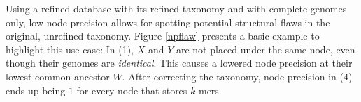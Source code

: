 \documentclass[pdflatex,sn-vancouver-num]{sn-jnl}
\begin{document}
%
    Using a refined database with its refined taxonomy and with complete genomes only, low node precision allows for spotting potential structural flaws in the original, unrefined taxonomy. Figure \ref{npflaw} presents a basic example to highlight this use case:
    In (1), $X$ and $Y$ are not placed under the same node, even though their genomes are \emph{identical}. This causes a lowered node precision at their lowest common ancestor $W$.
    After correcting the taxonomy, node precision in (4) ends up being $1$ for every node that stores $k$-mers.

\end{document}
